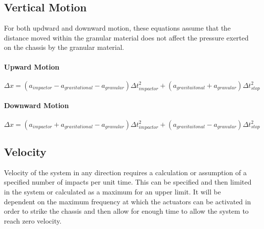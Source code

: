 \documentclass{article}
\begin{document}
\subsection{Vertical Motion}
For both updward and downward motion, these equations assume that the distance moved within the granular material does not affect the pressure exerted on the chassis by the granular material.
\paragraph{Upward Motion}
$$\Delta x = (a_{impactor} - a_{gravitational} - a_{granular}) \Delta t^2_{impactor} + (a_{gravitaitonal} + a_{granular}) \Delta t_{stop}^2$$
\paragraph{Downward Motion}
$$\Delta x = (a_{impactor} + a_{gravitational} - a_{granular}) \Delta t^2_{impactor} + (a_{gravitaitonal} - a_{granular}) \Delta t_{stop}^2$$
\subsection{Velocity}
Velocity of the system in any direction requires a calculation or assumption of a specified number of impacts per unit time. This can be specified and then limited in the system or calculated as a maximum for an upper limit. It will be dependent on the maximum frequency at which the actuators can be activated in order to strike the chassis and then allow for enough time to allow the system to reach zero velocity.
\end{document}
